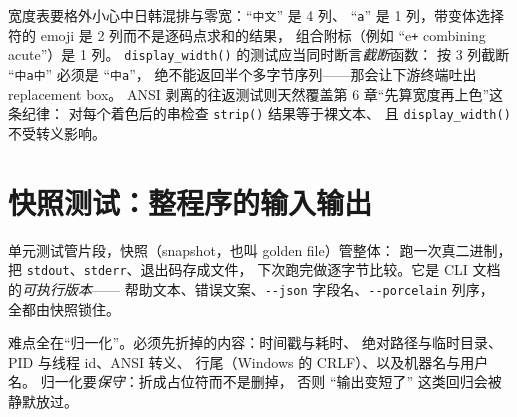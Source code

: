 \documentclass[12pt,a4paper,fontset=fandol]{ctexbook}
\newcommand{\Fn}[1]{\texttt{#1()}}
\newcommand{\Tp}[1]{\texttt{#1}}
\newcommand{\Opt}[1]{\texttt{-\/-#1}}
\begin{document}
宽度表要格外小心中日韩混排与零宽：``\Tp{中文}'' 是 4 列、
``\Tp{a}'' 是 1 列，带变体选择符的 emoji 是 2 列而不是逐码点求和的结果，
组合附标（例如 ``e\Tp{+}  combining acute''）是 1 列。
\Fn{display\_width} 的测试应当同时断言\emph{截断}函数：
按 3 列截断 ``\Tp{中a中}'' 必须是 ``\Tp{中a}''，
绝不能返回半个多字节序列——那会让下游终端吐出replacement box。
ANSI 剥离的往返测试则天然覆盖第 6 章``先算宽度再上色''这条纪律：
对每个着色后的串检查 \Fn{strip} 结果等于裸文本、
且 \Fn{display\_width} 不受转义影响。

\section{快照测试：整程序的输入输出}

单元测试管片段，快照（snapshot，也叫 golden file）管整体：
跑一次真二进制，把 \Tp{stdout}、\Tp{stderr}、退出码存成文件，
下次跑完做逐字节比较。它是 CLI 文档的\emph{可执行版本}——
帮助文本、错误文案、\Opt{json} 字段名、\Opt{porcelain} 列序，
全都由快照锁住。

难点全在``归一化''。必须先折掉的内容：时间戳与耗时、
绝对路径与临时目录、PID 与线程 id、ANSI 转义、
行尾（Windows 的 CRLF）、以及机器名与用户名。
归一化要\emph{保守}：折成占位符而不是删掉，
否则 ``输出变短了'' 这类回归会被静默放过。
\end{document}
